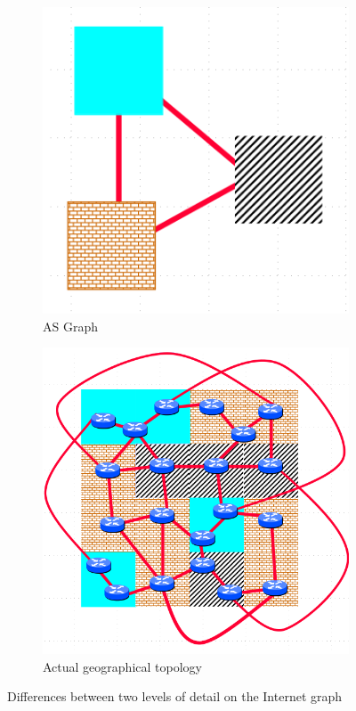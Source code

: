 \begin{figure}[h]
     \centering
     \begin{subfigure}[b]{0.45\textwidth}
         \centering
         \includegraphics[width=\textwidth]{images/BGP/ASTopology.png}
		 \caption{\ac{AS} Graph}
         \label{fig:as_graph}
     \end{subfigure}
     \hfill
     \begin{subfigure}[b]{0.45\textwidth}
         \centering
         \includegraphics[width=\textwidth]{images/BGP/InternetTopology.png}
		 \caption{Actual geographical topology}
         \label{fig:actual_topology}
     \end{subfigure}
		\caption{Differences between two levels of detail on the Internet graph
			}
        \label{fig:astopology_vs_internet}
\end{figure}

